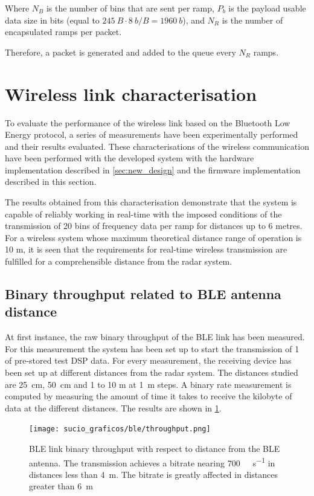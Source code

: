 Where $N_B$ is the number of bins that are sent per ramp, $P_b$ is the payload usable data size in bits (equal to $\SI{245}{B} \cdot \SI{8}{b\per B} = \SI{1960}{b}$), and $N_R$ is the number of encapsulated ramps per packet.

Therefore, a packet is generated and added to the queue every $N_R$ ramps.

\section{Wireless link characterisation} \label{sec:ble_characterisation}

To evaluate the performance of the wireless link based on the Bluetooth Low Energy protocol, a series of measurements have been experimentally performed and their results evaluated. These characterisations of the wireless communication have been performed with the developed system with the hardware implementation described in \cref{sec:new_design} and the firmware implementation described in this section.

The results obtained from this characterisation demonstrate that the system is capable of reliably working in real-time with the imposed conditions of the transmission of 20 bins of frequency data per ramp for distances up to 6 metres. For a wireless system whose maximum theoretical distance range of operation is 10 m, it is seen that the requirements for real-time wireless transmission are fulfilled for a comprehensible distance from the radar system.


\subsection{Binary throughput related to BLE antenna distance}

At first instance, the raw binary throughput of the BLE link has been measured. For this measurement the system has been set up to start the transmission of \SI{1}{\kilo\byte} of pre-stored test DSP data. For every measurement, the receiving device has been set up at different distances from the radar system. The distances studied are \SI{25}{\centi\metre}, \SI{50}{\centi\metre} and 1 to 10 \si{\metre} at \SI{1}{\metre} steps. A binary rate measurement is computed by measuring the amount of time it takes to receive the kilobyte of data at the different distances. The results are shown in \cref{fig:firmware_ble_char_bitrate}.

\begin{figure}[ht]
	\centering
	\texttt{[image: sucio\_graficos/ble/throughput.png]}
	\caption{BLE link binary throughput with respect to distance from the BLE antenna. The transmission achieves a bitrate nearing \SI{700}{\kilo\bit\per\second} in distances less than \SI{4}{\meter}. The bitrate is greatly affected in distances greater than \SI{6}{\meter}}
	\label{fig:firmware_ble_char_bitrate}
\end{figure}

